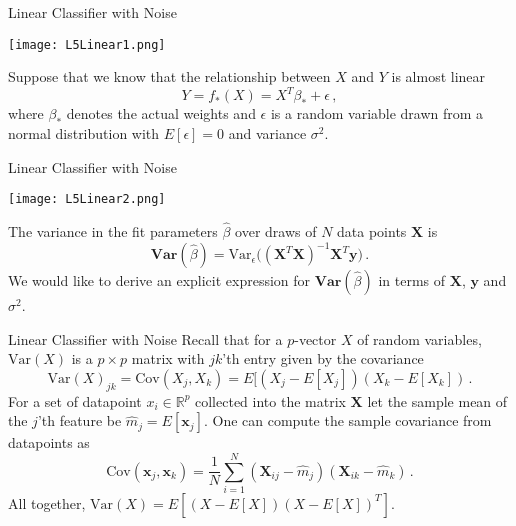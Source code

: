 \documentclass[10pt, table, dvipsnames,xcdraw, handout ]{beamer}
\newcommand{\bfX}{\ensuremath{\mathbf{X}}}
\newcommand{\bfy}{\ensuremath{\mathbf{y}}}
\begin{document}
\begin{frame}[fragile]{Linear Classifier with Noise}
  \begin{minipage}[t][0.5\textheight][t]{\textwidth}
	  \centering \texttt{[image: L5Linear1.png]}
  \end{minipage}
  \vfill
  \begin{minipage}[t][0.5\textheight][t]{\textwidth}
Suppose that we know that the relationship between $X$ and $Y$ is almost linear
$$
Y = f_*(X) = X^T\beta_* + \epsilon\,,
$$\pause
where $\beta_*$ denotes the actual weights and $\epsilon$ is a random variable drawn from a normal distribution with $E[\epsilon] = 0$ and variance $\sigma^2$.	
\end{minipage}
\end{frame}


\begin{frame}[fragile]{Linear Classifier with Noise}
  \begin{minipage}[t][0.5\textheight][t]{\textwidth}
	  \centering \texttt{[image: L5Linear2.png]}
  \end{minipage}
  \vfill
  \begin{minipage}[t][0.5\textheight][t]{\textwidth}
The variance in the fit parameters $\hat{\beta}$ over draws of $N$ data points $\bfX$ is
$$
\textbf{Var}(\hat{\beta}) = \text{Var}_{\epsilon}\big( (\bfX^T\bfX)^{-1}\bfX^T\bfy \big)\,.
$$
We would like to derive an explicit expression for $\textbf{Var}(\hat{\beta})$ in terms of $\bfX$, $\bfy$ and $\sigma^2$.
\end{minipage}
\end{frame}





\begin{frame}[fragile]{Linear Classifier with Noise}
Recall that for a $p$-vector $X$ of random variables, $\text{Var}(X)$ is a $p\times p$ matrix with $jk$'th entry given by the covariance
$$
\text{Var}(X)_{jk} = \text{Cov}(X_j,X_k) = E[(X_j-E[X_j])(X_k - E[X_k])\,.
$$\pause
For a set of datapoint $x_i\in \mathbb{R}^p$ collected into the matrix $\mathbf{X}$ let the sample mean of the $j$'th feature be $\hat{m}_j = E[\mathbf{x}_j]$. One can compute the sample covariance from datapoints as
$$
\text{Cov}(\mathbf{x}_j,\mathbf{x}_k)  = \frac1N \sum_{i=1}^N (\mathbf{X}_{ij} - \hat{m}_j)(\mathbf{X}_{ik} - \hat{m}_k)\,.
$$
All together, $\text{Var}(X)=E[(X - E[X])(X - E[X])^T]$.
\end{frame}
\end{document}
